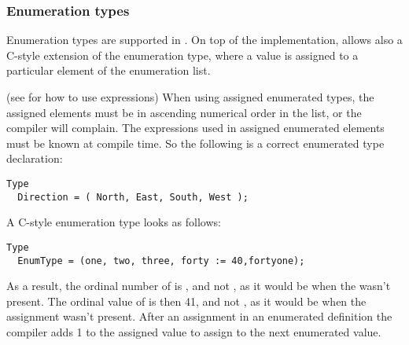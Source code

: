 \subsubsection{Enumeration types}
Enumeration types are supported in \fpc. On top of the \tp
implementation, \fpc allows also a C-style extension of the
enumeration type, where a value is assigned to a particular element of
the enumeration list.

(see  for how to use expressions)
When using assigned enumerated types, the assigned elements must be in
ascending numerical order in the list, or the compiler will complain.
The expressions used in assigned enumerated elements must be known at
compile time.
So the following is a correct enumerated type declaration:
\begin{verbatim}
Type
  Direction = ( North, East, South, West );
\end{verbatim}
A C-style enumeration type looks as follows:
\begin{verbatim}
Type
  EnumType = (one, two, three, forty := 40,fortyone);
\end{verbatim}
As a result, the ordinal number of  is , and not ,
as it would be when the  wasn't present.
The ordinal value of  is then {41}, and not , as it
would be when the assignment wasn't present. After an assignment in an
enumerated definition the compiler adds 1 to the assigned value to assign to
the next enumerated value.

